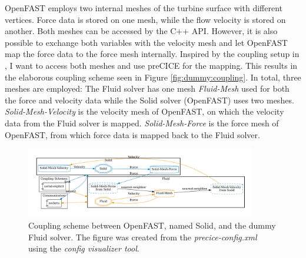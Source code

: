 OpenFAST employs two internal meshes of the turbine surface with different vertices. Force data is stored on one mesh, while the flow velocity is stored on another. Both meshes can be accessed by the C++ API. However, it is also possible to exchange both variables with the velocity mesh and let OpenFAST map the force data to the force mesh internally. Inspired by the coupling setup in \cite{Taschner:2022}, I want to access both meshes and use preCICE for the mapping. This results in the elaborous coupling scheme seen in Figure \ref{fig:dummy:coupling}. In total, three meshes are employed: The Fluid solver has one mesh \textit{Fluid-Mesh} used for both the force and velocity data while the Solid solver (OpenFAST) uses two meshes. \textit{Solid-Mesh-Velocity} is the velocity mesh of OpenFAST, on which the velocity data from the Fluid solver is mapped. \textit{Solid-Mesh-Force} is the force mesh of OpenFAST, from which force data is mapped back to the Fluid solver.

\begin{figure}[h]
	\centering
	\includegraphics[width=0.9\textwidth]{images/openfast-dummy-coupling-scheme.png}
	\caption{Coupling scheme between OpenFAST, named Solid, and the dummy Fluid solver. The figure was created from the \textit{precice-config.xml} using the \textit{config visualizer tool}\protect\footnotemark.}
	\label{fig:openfast:coupling}
\end{figure}


